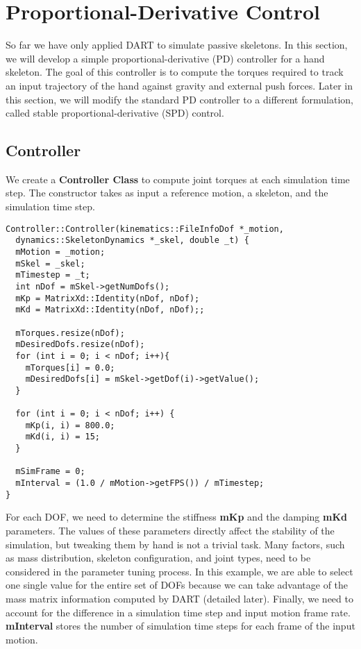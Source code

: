 \section{Proportional-Derivative Control}
So far we have only applied DART to simulate passive skeletons. In
this section, we will develop a simple proportional-derivative (PD)
controller for a hand skeleton. The goal of this controller is to
compute the torques required to track an input trajectory of the hand
against gravity and external push forces. Later in this section, we
will modify the standard PD controller to a different formulation,
called stable proportional-derivative (SPD) control.

\subsection{Controller}
We create a \textbf{Controller Class} to compute joint torques at each
simulation time step. The constructor takes as input a reference
motion, a skeleton, and the simulation time step. 
\ttfamily
\begin{lstlisting}[caption=Controller.cpp]
Controller::Controller(kinematics::FileInfoDof *_motion, 
  dynamics::SkeletonDynamics *_skel, double _t) {
  mMotion = _motion;
  mSkel = _skel;
  mTimestep = _t;
  int nDof = mSkel->getNumDofs();
  mKp = MatrixXd::Identity(nDof, nDof);
  mKd = MatrixXd::Identity(nDof, nDof);;
  
  mTorques.resize(nDof);
  mDesiredDofs.resize(nDof);
  for (int i = 0; i < nDof; i++){
    mTorques[i] = 0.0;
    mDesiredDofs[i] = mSkel->getDof(i)->getValue();
  }

  for (int i = 0; i < nDof; i++) {
    mKp(i, i) = 800.0;
    mKd(i, i) = 15;
  }

  mSimFrame = 0;
  mInterval = (1.0 / mMotion->getFPS()) / mTimestep;
}
\end{lstlisting}
\rmfamily 

For each DOF, we need to determine the stiffness \textbf{mKp} and the
damping \textbf{mKd} parameters. The values of these parameters
directly affect the stability of the simulation, but tweaking them by
hand is not a trivial task. Many factors, such as mass distribution,
skeleton configuration, and joint types, need to be considered in the
parameter tuning process. In this example, we are able to select one
single value for the entire set of DOFs because we can take advantage
of the mass matrix information computed by DART (detailed
later). Finally, we need to account for the difference in a simulation
time step and input motion frame rate. \textbf{mInterval} stores the
number of simulation time steps for each frame of the input motion.

